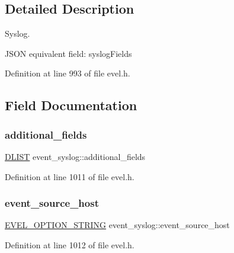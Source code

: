 \subsection{Detailed Description}
Syslog. 

J\+S\+ON equivalent field\+: syslog\+Fields 

Definition at line 993 of file evel.\+h.



\subsection{Field Documentation}
\hypertarget{structevent__syslog_ab832fb3de19d604690eeb5b232954923}{}\label{structevent__syslog_ab832fb3de19d604690eeb5b232954923} 
\subsubsection{\texorpdfstring{additional\+\_\+fields}{additional\_fields}}
{\footnotesize\ttfamily \hyperlink{double__list_8h_a45f4a129042d9e1aa4ffd31fe13e4d14}{D\+L\+I\+ST} event\+\_\+syslog\+::additional\+\_\+fields}



Definition at line 1011 of file evel.\+h.

\hypertarget{structevent__syslog_a47953309ed3ba9092682b173c4ba3d05}{}\label{structevent__syslog_a47953309ed3ba9092682b173c4ba3d05} 
\subsubsection{\texorpdfstring{event\+\_\+source\+\_\+host}{event\_source\_host}}
{\footnotesize\ttfamily \hyperlink{evel_8h_a0de5113a7b72de93c0c7b644f7ea7ec3}{E\+V\+E\+L\+\_\+\+O\+P\+T\+I\+O\+N\+\_\+\+S\+T\+R\+I\+NG} event\+\_\+syslog\+::event\+\_\+source\+\_\+host}



Definition at line 1012 of file evel.\+h.

\hypertarget{structevent__syslog_a08f3d14d55bcdd7c1a3e1887503c1576}{}\label{structevent__syslog_a08f3d14d55bcdd7c1a3e1887503c1576} 
